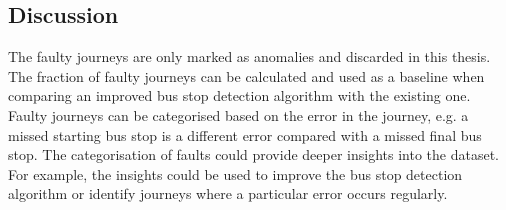 \subsection{Discussion}
The faulty journeys are only marked as anomalies and discarded in this thesis.
The fraction of faulty journeys can be calculated and used as a baseline when comparing an improved bus stop detection algorithm with the existing one.
Faulty journeys can be categorised based on the error in the journey, e.g. a missed starting bus stop is a different error compared with a missed final bus stop.
The categorisation of faults could provide deeper insights into the dataset.
For example, the insights could be used to improve the bus stop detection algorithm or identify journeys where a particular error occurs regularly.    